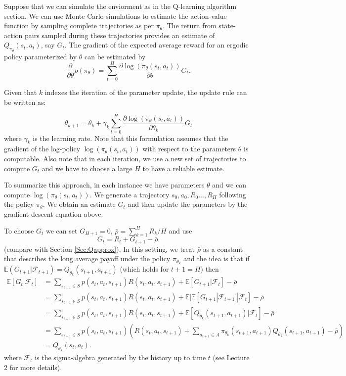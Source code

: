\documentclass[letter,11pt]{article}
\begin{document}
Suppose that we can simulate the enviorment as in the Q-learning algorithm section. We can use Monte Carlo simulations to estimate the action-value function by sampling complete trajectories as per $\pi_\theta$. The return from state-action pairs sampled during these trajectories provides an  estimate of $Q_{\pi_\theta}(s_t, a_t)$, say $G_{t}$. The gradient of the expected average reward for an ergodic policy parameterized by $\theta$ can be estimated by
\[
\frac{\partial }{\partial \theta}\rho (\pi_{\theta} )  =  \sum_{t=0}^{H} \frac{\partial \log (\pi_\theta(s_t, a_t))}{\partial \theta}  G_t.   
\]


Given that \( k \) indexes the iteration of the parameter update, the update rule can be written as:

\[
\theta_{k+1} = \theta_k + \gamma_k \sum_{t=0}^{H} \frac{\partial \log (\pi_\theta(s_t, a_t))}{\partial \theta_k} G_t
\]
where $\gamma_{k}$ is the learning rate. 
Note that this formulation assumes that the gradient of the log-policy \( \log (\pi_\theta(s_t, a_t)) \) with respect to the parameters \( \theta \) is computable. Also note that in each iteration, we use a new set of trajectories to compute $G_{t}$ and we have to choose a large $H$ to have a reliable estimate. 


To summarize this approach, in each instance we have parameters $\theta$ and we can compute \( \log (\pi_\theta(s_t, a_t)) \). We generate a trajectory $s_{0},a_{0}, R_{0} \ldots, R_{H}$ following the policy $\pi_{\theta }$. We obtain an estimate $G_{t}$ and then update the parameters by the gradient descent equation above. 



To choose $G_{t}$ we can set $G_{H+1}=0$, $\bar{\rho} = \sum _{k=1}^{H} R_{k}/H$ and use 
\[ G_t = R_{t} + G_{t+1} - \bar{\rho}.
\]
(compare with Section \ref{Sec:Qapprox}).  
In this setting, we treat $\bar{\rho}$ as a constant that describes the long average payoff under the policy $\pi_{\theta_{k}}$ and the idea is that if  $\mathbb{E} (G_{t+1} |\mathcal{F}_{t+1} ) = Q_{\theta_{k}}(s_{t+1},a_{t+1}) $ (which holds for $t+1=H $) then 
\begin{align*}
    \mathbb{E} [ G_{t} | \mathcal{F}_{t} ] & = \sum _{s_{t+1} \in S} p(s_{t},a_{t},s_{t+1}) R(s_{t},a_{t},s_{t+1}) +  \mathbb{E} [ G_{t+1} | \mathcal{F}_{t} ]- \bar{\rho}  \\
    & =  \sum _{s_{t+1} \in S} p(s_{t},a_{t},s_{t+1})R(s_{t},a_{t},s_{t+1}) +  \mathbb{E} [\mathbb{E} [ G_{t+1} | \mathcal{F}_{t+1} ]| \mathcal{F}_{t} ]- \bar{\rho}   \\
    & =  \sum _{s_{t+1} \in S} p(s_{t},a_{t},s_{t+1})R(s_{t},a_{t},s_{t+1}) +  \mathbb{E} [Q_{\theta_{k}}(s_{t+1},a_{t+1})| \mathcal{F}_{t} ]- \bar{\rho}  \\
    & =  \sum _{s_{t+1} \in S} p(s_{t},a_{t},s_{t+1}) \left ( R(s_{t},a_{t},s_{t+1}) + \sum_{a_{t+1} \in A} \pi_{\theta_{k}} (s_{t+1},a_{t+1}) Q_{\theta_{k}}(s_{t+1}, a_{t+1})- \bar{\rho} \right ) \\ 
    & = Q_{\theta_{k}}(s_{t},a_{t}).
    \end{align*} 
where $\mathcal{F}_{t}$ is the sigma-algebra generated by the history up to time $t$  (see Lecture 2 for more details).
\end{document}
